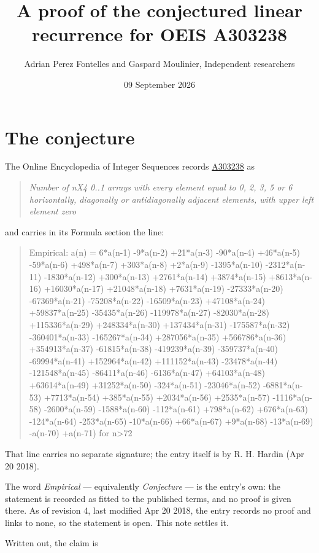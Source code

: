 \documentclass[11pt]{article}
\title{A proof of the conjectured linear recurrence for OEIS A303238}
\author{Adrian Perez Fontelles and Gaspard Moulinier, Independent researchers}
\date{09 September 2026}
\theoremstyle{definition}
\begin{document}
\maketitle
\section{The conjecture}

The Online Encyclopedia of Integer Sequences records \href{https://oeis.org/A303238}{A303238} as

\begin{quote}\itshape Number of nX4 0..1 arrays with every element equal to 0, 2, 3, 5 or 6 horizontally, diagonally or antidiagonally adjacent elements, with upper left element zero\end{quote}

and carries in its Formula section the line:

\begin{quote}\ttfamily Empirical: a(n) = 6*a(n-1) -9*a(n-2) +21*a(n-3) -90*a(n-4) +46*a(n-5) -59*a(n-6) +498*a(n-7) +303*a(n-8) +2*a(n-9) -1395*a(n-10) -2312*a(n-11) -1830*a(n-12) +300*a(n-13) +2761*a(n-14) +3874*a(n-15) +8613*a(n-16) +16030*a(n-17) +21048*a(n-18) +7631*a(n-19) -27333*a(n-20) -67369*a(n-21) -75208*a(n-22) -16509*a(n-23) +47108*a(n-24) +59837*a(n-25) -35435*a(n-26) -119978*a(n-27) -82030*a(n-28) +115336*a(n-29) +248334*a(n-30) +137434*a(n-31) -175587*a(n-32) -360401*a(n-33) -165267*a(n-34) +287056*a(n-35) +566786*a(n-36) +354913*a(n-37) -61815*a(n-38) -419239*a(n-39) -359737*a(n-40) -69994*a(n-41) +152964*a(n-42) +111152*a(n-43) -23478*a(n-44) -121548*a(n-45) -86411*a(n-46) -6136*a(n-47) +64103*a(n-48) +63614*a(n-49) +31252*a(n-50) -324*a(n-51) -23046*a(n-52) -6881*a(n-53) +7713*a(n-54) +385*a(n-55) +2034*a(n-56) +2535*a(n-57) -1116*a(n-58) -2600*a(n-59) -1588*a(n-60) -112*a(n-61) +798*a(n-62) +676*a(n-63) -124*a(n-64) -253*a(n-65) -10*a(n-66) +66*a(n-67) +9*a(n-68) -13*a(n-69) -a(n-70) +a(n-71) for n>72\end{quote}

That line carries no separate signature; the entry itself is by R. H. Hardin (Apr 20 2018).

The word {\itshape Empirical} --- equivalently {\itshape Conjecture} --- is the entry's own: the statement is recorded as fitted to the published terms, and no proof is given there. As of revision 4, last modified Apr 20 2018, the entry records no proof and links to none, so the statement is open. This note settles it.

Written out, the claim is
\end{document}

